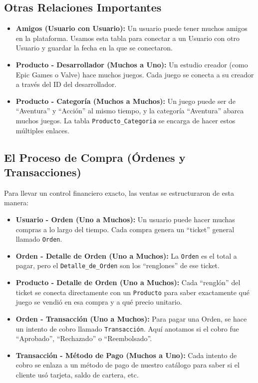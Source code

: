 \documentclass[11pt,a4paper]{article}
\begin{document}
\subsection{Otras Relaciones Importantes}

\begin{itemize}
\item \textbf{Amigos (Usuario con Usuario):} Un usuario puede tener muchos amigos en la plataforma. Usamos esta tabla para conectar a un Usuario con otro Usuario y guardar la fecha en la que se conectaron.

\item \textbf{Producto - Desarrollador (Muchos a Uno):} Un estudio creador (como Epic Games o Valve) hace muchos juegos. Cada juego se conecta a su creador a través del ID del desarrollador.

\item \textbf{Producto - Categoría (Muchos a Muchos):} Un juego puede ser de ``Aventura'' y ``Acción'' al mismo tiempo, y la categoría ``Aventura'' abarca muchos juegos. La tabla \texttt{Producto\_Categoria} se encarga de hacer estos múltiples enlaces.
\end{itemize}

\subsection{El Proceso de Compra (Órdenes y Transacciones)}

Para llevar un control financiero exacto, las ventas se estructuraron de esta manera:

\begin{itemize}
\item \textbf{Usuario - Orden (Uno a Muchos):} Un usuario puede hacer muchas compras a lo largo del tiempo. Cada compra genera un ``ticket'' general llamado \texttt{Orden}.

\item \textbf{Orden - Detalle de Orden (Uno a Muchos):} La \texttt{Orden} es el total a pagar, pero el \texttt{Detalle\_de\_Orden} son los ``renglones'' de ese ticket.

\item \textbf{Producto - Detalle de Orden (Uno a Muchos):} Cada ``renglón'' del ticket se conecta directamente con un \texttt{Producto} para saber exactamente qué juego se vendió en esa compra y a qué precio unitario.

\item \textbf{Orden - Transacción (Uno a Muchos):} Para pagar una Orden, se hace un intento de cobro llamado \texttt{Transacción}. Aquí anotamos si el cobro fue ``Aprobado'', ``Rechazado'' o ``Reembolsado''.

\item \textbf{Transacción - Método de Pago (Muchos a Uno):} Cada intento de cobro se enlaza a un método de pago de nuestro catálogo para saber si el cliente usó tarjeta, saldo de cartera, etc.
\end{itemize}
\end{document}
